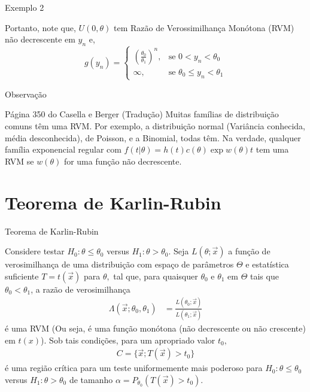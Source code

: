 \documentclass[12pt]{beamer}
\begin{document}
\begin{frame}{Exemplo 2}
\begin{block}{}
\justifying
Portanto, note que, $U(0, \theta)$ tem Razão de Verossimilhança Monótona (RVM) não decrescente em $y_n$ e,
\[
g(y_n) = \begin{cases} 
\left(\frac{\theta_0}{\theta_1}\right)^n, & \text{se } 0 < y_n < \theta_0 \\
\infty, & \text{se } \theta_0 \leq y_n < \theta_1
\end{cases}
\]
\end{block}
\end{frame}

\begin{frame}{Observação}
\begin{block}{Página 350 do Casella e Berger (Tradução)}
\justifying
Muitas famílias de distribuição comuns têm uma RVM. Por exemplo, a distribuição normal (Variância conhecida, média desconhecida), de Poisson, e a Binomial, todas têm. Na verdade, qualquer família exponencial regular com $f(t|\theta)=h(t)c(\theta)\exp{w(\theta)t}$ tem uma RVM se $w(\theta)$ for uma função não decrescente.
\end{block}
\end{frame}

\section{Teorema de Karlin-Rubin}
\begin{frame}{Teorema de Karlin-Rubin}
\vspace{-0.2cm}
\begin{block}{}
\justifying
Considere testar $H_{0}: \theta \leq \theta_0$ versus $H_{1}: \theta > \theta_0.$
Seja $L(\theta; \Vec{x})$ a função de verosimilhança de uma distribuição com espaço de parâmetros $\Theta$ e estatística suficiente $T = t(\Vec{x})$ para $\theta,$ tal que, para quaisquer $\theta_0$ e $\theta_1$ em $\Theta$ tais que $\theta_0 < \theta_1$, a razão de verosimilhança
\begin{align*}
\Lambda(\Vec{x}; \theta_0, \theta_1) &= \frac{L(\theta_0; \Vec{x})}{L(\theta_1; \Vec{x})}
\end{align*}
é uma RVM (Ou seja, é uma função monótona (não decrescente ou não crescente) em $t(x)$). Sob tais condições, para um apropriado valor $t_{0},$ 
\begin{align*}
    C=\{\Vec{x};T(\Vec{x})> t_{0}\} 
\end{align*}
é uma região crítica para um teste uniformemente mais poderoso para $H_{0}: \theta \leq \theta_0$ versus $H_{1}: \theta > \theta_0$ de tamanho $\alpha=P_{\theta_{0}}(T(\Vec{x})> t_{0})$.
\end{block}
\end{frame}
\end{document}

